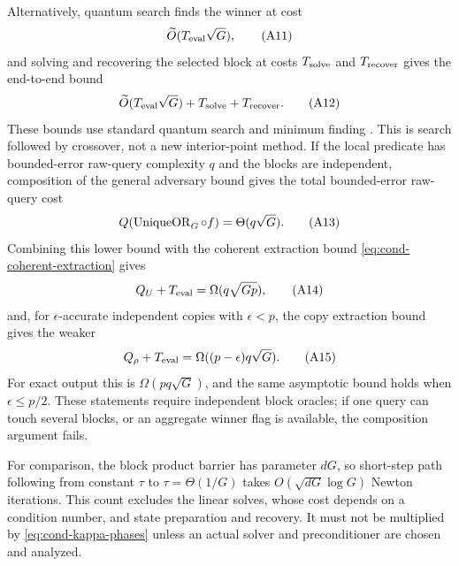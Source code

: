 Alternatively, quantum search finds the winner at cost
\begin{equation*}
 \Otilde(T_{\rm eval}\sqrt G),                                      \condtag{A11}\label{eq:cond-direct-search}
\end{equation*}
and solving and recovering the selected block at costs $T_{\rm solve}$ and
$T_{\rm recover}$ gives the end-to-end bound
\begin{equation*}
 \Otilde(T_{\rm eval}\sqrt G)+T_{\rm solve}+T_{\rm recover}.          \condtag{A12}\label{eq:cond-search-crossover}
\end{equation*}
These bounds use standard quantum search and minimum finding
\cite{boyer1998-tight-bounds-on-quantum-searching,durr1996-a-quantum-algorithm-for-finding}.
This is search followed by crossover, not a new interior-point method.  If
the local predicate has bounded-error raw-query complexity $q$ and the
blocks are independent, composition of the general adversary bound
\cite{hyer2005-tight-adversary-bounds-for-composite,lee2011-quantum-query-complexity-of-state,reichardt2011-reflections-for-quantum-query-algorithms}
gives the total bounded-error raw-query cost
\begin{equation*}
 Q(\operatorname{UniqueOR}_G\circ f)=\Theta(q\sqrt G).                \condtag{A13}\label{eq:cond-search-composition}
\end{equation*}
Combining this lower bound with the coherent extraction bound
\eqref{eq:cond-coherent-extraction} gives
\begin{equation*}
 Q_U+T_{\rm eval}=\Omega(q\sqrt{Gp}),                                  \condtag{A14}\label{eq:cond-prep-tradeoff}
\end{equation*}
and, for $\epsilon$-accurate independent copies with $\epsilon<p$, the copy
extraction bound gives the weaker
\begin{equation*}
 Q_\rho+T_{\rm eval}=\Omega((p-\epsilon)q\sqrt G).                    \condtag{A15}\label{eq:cond-copy-tradeoff}
\end{equation*}
For exact output this is $\Omega(pq\sqrt G)$, and the same asymptotic bound
holds when $\epsilon\le p/2$.
These statements require independent block oracles; if one query can touch
several blocks, or an aggregate winner flag is available, the composition
argument fails.

For comparison, the block product barrier has parameter $dG$, so short-step
path following from constant $\tau$ to $\tau=\Theta(1/G)$ takes
$O(\sqrt{dG}\log G)$ Newton iterations.  This count excludes the linear
solves, whose cost depends on a condition number, and state preparation and
recovery.  It must not be multiplied by \eqref{eq:cond-kappa-phases} unless
an actual solver and preconditioner are chosen and analyzed.

